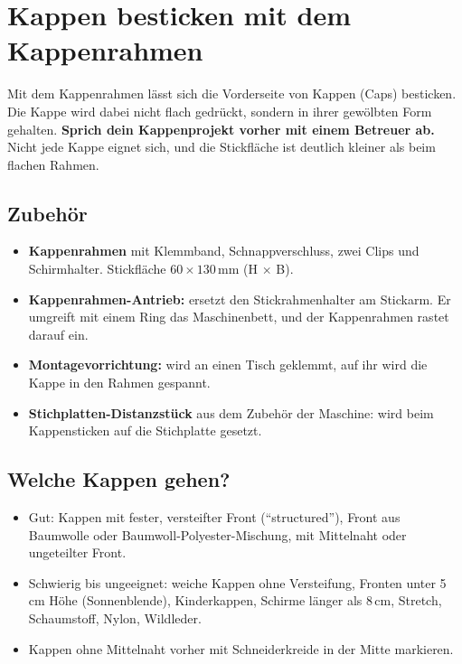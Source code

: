 \documentclass{\basedir/fablab-document}
\begin{document}
	\section{Kappen besticken mit dem Kappenrahmen}
	\label{sec:kappen}

	Mit dem Kappenrahmen lässt sich die Vorderseite von Kappen (Caps) besticken. Die Kappe wird dabei nicht flach gedrückt, sondern in ihrer gewölbten Form gehalten. \textbf{Sprich dein Kappenprojekt vorher mit einem Betreuer ab.} Nicht jede Kappe eignet sich, und die Stickfläche ist deutlich kleiner als beim flachen Rahmen.

	\subsection{Zubehör}
	\begin{itemize}
		\item \textbf{Kappenrahmen} mit Klemmband, Schnappverschluss, zwei Clips und Schirmhalter. Stickfläche $60 \times 130$\,mm (H $\times$ B).
		\item \textbf{Kappenrahmen-Antrieb:} ersetzt den Stickrahmenhalter am Stickarm. Er umgreift mit einem Ring das Maschinenbett, und der Kappenrahmen rastet darauf ein.
		\item \textbf{Montagevorrichtung:} wird an einen Tisch geklemmt, auf ihr wird die Kappe in den Rahmen gespannt.
		\item \textbf{Stichplatten-Distanzstück} aus dem Zubehör der Maschine: wird beim Kappensticken auf die Stichplatte gesetzt.
	\end{itemize}

	\subsection{Welche Kappen gehen?}
	\begin{itemize}
		\item Gut: Kappen mit fester, versteifter Front (\enquote{structured}), Front aus Baumwolle oder Baumwoll-Polyester-Mischung, mit Mittelnaht oder ungeteilter Front.
		\item Schwierig bis ungeeignet: weiche Kappen ohne Versteifung, Fronten unter 5\,cm Höhe (Sonnenblende), Kinderkappen, Schirme länger als 8\,cm, Stretch, Schaumstoff, Nylon, Wildleder.
		\item Kappen ohne Mittelnaht vorher mit Schneiderkreide in der Mitte markieren.
	\end{itemize}
\end{document}
